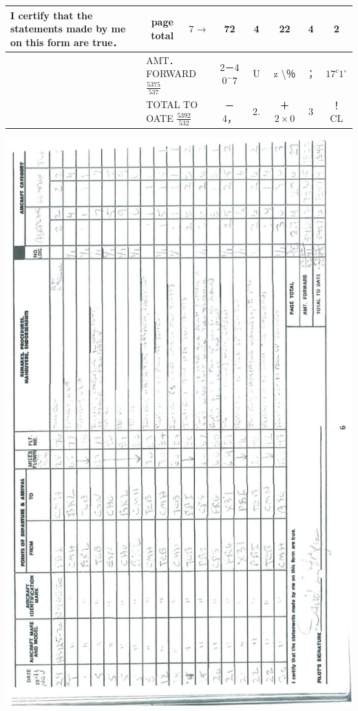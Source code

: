 \documentclass[10pt]{article}
\begin{document}
\begin{center}
\begin{tabular}{|c|c|c|c|c|c|c|c|c|c|c|c|c|c|c|}
\hline
\multicolumn{8}{|l|}{\multirow[t]{3}{*}{I certify that the statements made by me on this form are true．}} & page total & \(7 \rightarrow\) & 72 & 4 & 22 & 4 & 2 \\
\hline
 &  &  &  &  &  &  &  & \multicolumn{2}{|l|}{AMT．FORWARD \(\frac{5375}{537}\)} & 2－4 \(0^{-} 7\) & \(\ddot{\text { U }}\) & z \textbackslash ％ & ； & \(17^{c} 1^{\circ}\) \\
\hline
 & \multicolumn{7}{|l|}{} & \multicolumn{2}{|l|}{TOTAL TO OATE \(\frac{5392}{532}\)} & －4， & 2. & ＋ \(2 \times 0\) & 3 & ！ CL \\
\hline
\end{tabular}
\end{center}

\includegraphics[max width=\textwidth, center]{2025_02_27_dd68c3d38de88f0516d9g-010}\\
\end{document}
